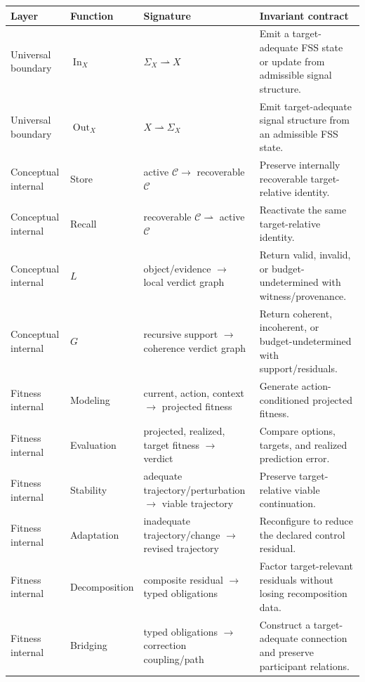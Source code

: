 \documentclass[11pt]{article}
\newcommand{\C}{\mathcal{C}}
\newcommand{\Sig}{\Sigma}
\newcommand{\InOp}{\operatorname{In}}
\newcommand{\OutOp}{\operatorname{Out}}
\begin{document}
\begin{longtable}{p{}p{}p{}p{}}
\toprule
\textbf{Layer} & \textbf{Function} & \textbf{Signature} & \textbf{Invariant contract}\\
\midrule\endhead
Universal boundary & $\InOp_X$ & $\Sig_X\rightharpoonup X$ & Emit a target-adequate FSS state or update from admissible signal structure.\\
Universal boundary & $\OutOp_X$ & $X\rightharpoonup\Sig_X$ & Emit target-adequate signal structure from an admissible FSS state.\\
Conceptual internal & Store & active $\C\rightarrow$ recoverable $\C$ & Preserve internally recoverable target-relative identity.\\
Conceptual internal & Recall & recoverable $\C\rightharpoonup$ active $\C$ & Reactivate the same target-relative identity.\\
Conceptual internal & $L$ & object/evidence $\rightarrow$ local verdict graph & Return valid, invalid, or budget-undetermined with witness/provenance.\\
Conceptual internal & $G$ & recursive support $\rightarrow$ coherence verdict graph & Return coherent, incoherent, or budget-undetermined with support/residuals.\\
Fitness internal & Modeling & current, action, context $\rightarrow$ projected fitness & Generate action-conditioned projected fitness.\\
Fitness internal & Evaluation & projected, realized, target fitness $\rightarrow$ verdict & Compare options, targets, and realized prediction error.\\
Fitness internal & Stability & adequate trajectory/perturbation $\rightarrow$ viable trajectory & Preserve target-relative viable continuation.\\
Fitness internal & Adaptation & inadequate trajectory/change $\rightarrow$ revised trajectory & Reconfigure to reduce the declared control residual.\\
Fitness internal & Decomposition & composite residual $\rightarrow$ typed obligations & Factor target-relevant residuals without losing recomposition data.\\
Fitness internal & Bridging & typed obligations $\rightarrow$ correction coupling/path & Construct a target-adequate connection and preserve participant relations.\\
\bottomrule
\end{longtable}
\end{document}
